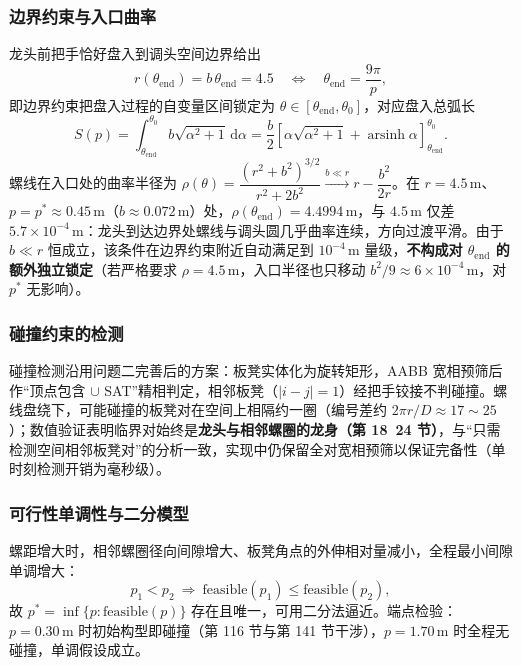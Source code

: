 ﻿\documentclass{cumcmthesis}
\begin{document}
\subsubsection{边界约束与入口曲率}
龙头前把手恰好盘入到调头空间边界给出
\begin{equation}
r(\theta_{\mathrm{end}}) = b\,\theta_{\mathrm{end}} = 4.5
\quad\Longleftrightarrow\quad
\theta_{\mathrm{end}} = \frac{9\pi}{p},
\label{eq:p3bound}
\end{equation}
即边界约束把盘入过程的自变量区间锁定为 $\theta\in[\theta_{\mathrm{end}},\theta_0]$，对应盘入总弧长
\begin{equation}
S(p)=\int_{\theta_{\mathrm{end}}}^{\theta_0} b\sqrt{\alpha^2+1}\,\mathrm{d}\alpha
= \frac{b}{2}\left[\alpha\sqrt{\alpha^2+1}+\operatorname{arsinh}\alpha\right]_{\theta_{\mathrm{end}}}^{\theta_0}.
\end{equation}
螺线在入口处的曲率半径为 $\rho(\theta)=\dfrac{(r^2+b^2)^{3/2}}{r^2+2b^2}\xrightarrow{b\ll r} r-\dfrac{b^2}{2r}$。在 $r=4.5\,\text{m}$、$p=p^{*}\approx0.45\,\text{m}$（$b\approx0.072\,\text{m}$）处，$\rho(\theta_{\mathrm{end}})=4.4994\,\text{m}$，与 $4.5\,\text{m}$ 仅差 $5.7\times10^{-4}\,\text{m}$：龙头到达边界处螺线与调头圆几乎曲率连续，方向过渡平滑。由于 $b\ll r$ 恒成立，该条件在边界约束附近自动满足到 $10^{-4}\,\text{m}$ 量级，\textbf{不构成对 $\theta_{\mathrm{end}}$ 的额外独立锁定}（若严格要求 $\rho=4.5\,\text{m}$，入口半径也只移动 $b^2/9\approx6\times10^{-4}\,\text{m}$，对 $p^{*}$ 无影响）。

\subsubsection{碰撞约束的检测}
碰撞检测沿用问题二完善后的方案：板凳实体化为旋转矩形，AABB 宽相预筛后作“顶点包含 $\cup$ SAT”精相判定，相邻板凳（$|i-j|=1$）经把手铰接不判碰撞。螺线盘绕下，可能碰撞的板凳对在空间上相隔约一圈（编号差约 $2\pi r/D\approx17\sim25$）；数值验证表明临界对始终是\textbf{龙头与相邻螺圈的龙身（第 18~24 节）}，与“只需检测空间相邻板凳对”的分析一致，实现中仍保留全对宽相预筛以保证完备性（单时刻检测开销为毫秒级）。

\subsubsection{可行性单调性与二分模型}
螺距增大时，相邻螺圈径向间隙增大、板凳角点的外伸相对量减小，全程最小间隙单调增大：
\begin{equation}
p_1<p_2\ \Rightarrow\ \mathrm{feasible}(p_1)\leq \mathrm{feasible}(p_2),
\end{equation}
故 $p^{*}=\inf\{p:\mathrm{feasible}(p)\}$ 存在且唯一，可用二分法逼近。端点检验：$p=0.30\,\text{m}$ 时初始构型即碰撞（第 116 节与第 141 节干涉），$p=1.70\,\text{m}$ 时全程无碰撞，单调假设成立。
\end{document}
